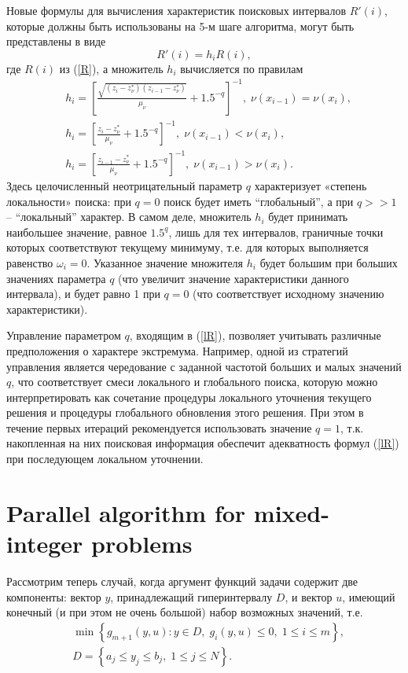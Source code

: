 \documentclass[
11pt,%
tightenlines,%
twoside,%
onecolumn,%
nofloats,%
nobibnotes,%
nofootinbib,%
superscriptaddress,%
noshowpacs,%
centertags]%
{revtex4}
\begin{document}
Новые формулы для вычисления характеристик поисковых интервалов $R'(i)$, которые должны быть использованы на 5-м шаге алгоритма, могут быть представлены в виде 
\[
R'(i) = h_i R(i),
\]
где $R(i)$ из (\ref{R}), а множитель $h_i$ вычисляется по правилам
\begin{eqnarray}\label{lR}
& h_i = \left[\frac{\sqrt{(z_i-z_\nu^*)(z_{i-1}-z_\nu^*)}}{\mu_\nu}+1.5^{-q}\right]^{-1}, \; \nu(x_{i-1})=\nu(x_{i}),\nonumber\\
& h_i = \left[\frac{z_i-z_\nu^*}{\mu_\nu}+1.5^{-q}\right]^{-1}, \; \nu(x_{i-1})<\nu(x_{i}),\\
& h_i = \left[\frac{z_{i-1}-z_\nu^*}{\mu_\nu}+1.5^{-q}\right]^{-1}, \; \nu(x_{i-1})>\nu(x_{i}).\nonumber
\end{eqnarray}
Здесь целочисленный неотрицательный параметр $q$ характеризует «степень локальности» поиска: при $q=0$ поиск будет иметь ``глобальный'', а при $q>>1$ -- ``локальный'' характер. 
В самом деле, множитель $h_i$ будет принимать наибольшее значение, равное $1.5^q$, лишь для тех интервалов, граничные точки которых соответствуют текущему минимуму, т.е. для которых выполняется равенство $\omega_i = 0$. Указанное значение множителя $h_i$ будет большим при больших значениях параметра $q$ (что увеличит значение характеристики данного интервала), и будет равно 1 при $q=0$ (что соответствует исходному значению характеристики). 

Управление параметром $q$, входящим в (\ref{lR}), позволяет учитывать различные предположения о характере экстремума. Например, одной из стратегий управления является чередование с заданной частотой больших и малых значений $q$, что соответствует смеси локального и глобального поиска, которую можно интерпретировать как сочетание процедуры локального уточнения текущего решения и процедуры глобального обновления этого решения. При этом в течение первых итераций рекомендуется использовать значение $q=1$, т.к. накопленная на них поисковая информация обеспечит адекватность формул (\ref{lR}) при последующем локальном уточнении.


\section{Parallel algorithm for mixed-integer problems}

Рассмотрим теперь случай, когда аргумент функций задачи содержит две компоненты: вектор $y$, принадлежащий гиперинтервалу $D$, и вектор $u$, имеющий конечный (и при этом не очень большой) набор возможных значений, т.е. 
\begin{eqnarray}\label{problem_i}
& \min{\left\{ g_{m+1}(y,u):y\in D, \; g_i(y,u)\leq 0, \; 1 \leq i \leq m\right\}},\\
& D=\left\{a_j\leq y_j \leq b_j, \; 1\leq j \leq N \right\}.\nonumber
\end{eqnarray}
\end{document}
